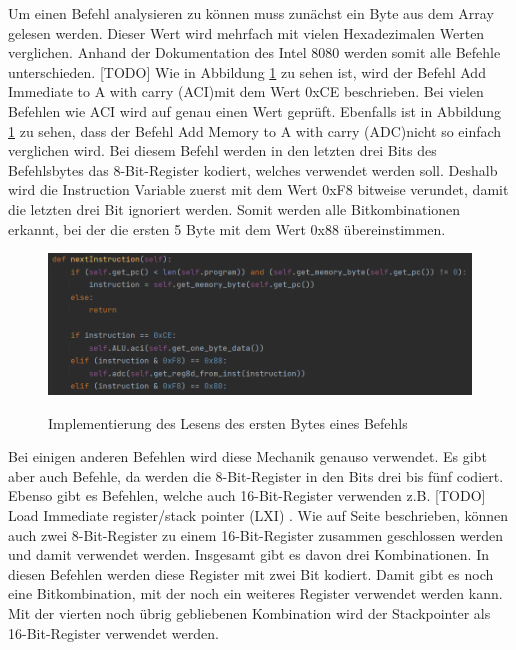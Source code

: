 \documentclass[12pt]{article}
\newcommand{\imgSpaceBefore}{\\[0.2cm]}
\begin{document}
Um einen Befehl analysieren zu können muss zunächst ein Byte aus dem Array gelesen werden. Dieser Wert wird mehrfach mit vielen Hexadezimalen Werten verglichen. Anhand der Dokumentation des Intel 8080 werden somit alle Befehle unterschieden. 
[TODO] Wie in  Abbildung \ref{fig:ReadInstruction} zu sehen ist, wird der Befehl \glqq Add Immediate to A with carry (ACI)\grqq mit dem Wert 0xCE beschrieben.  
Bei vielen Befehlen wie ACI wird auf genau einen Wert geprüft. Ebenfalls ist in Abbildung \ref{fig:ReadInstruction} zu sehen, dass der Befehl \glqq Add Memory to A with carry (ADC)\grqq nicht so einfach verglichen wird. Bei diesem Befehl werden in den letzten drei Bits des Befehlsbytes das 8-Bit-Register kodiert, welches verwendet werden soll. Deshalb wird die Instruction Variable zuerst mit dem Wert 0xF8 bitweise verundet, damit die letzten drei Bit ignoriert werden. Somit werden alle Bitkombinationen erkannt, bei der die ersten 5 Byte mit dem Wert 0x88 übereinstimmen. 
\imgSpaceBefore

\begin{figure}[h]
\caption{Implementierung des Lesens des ersten Bytes eines Befehls}
\centering
\includegraphics[width=15cm]{Bilder/ReadInstruction}
\label{fig:ReadInstruction}
\end{figure}

Bei einigen anderen Befehlen wird diese Mechanik genauso verwendet. Es gibt aber auch Befehle, da werden die 8-Bit-Register in den Bits drei bis fünf codiert. Ebenso gibt es Befehlen, welche auch 16-Bit-Register verwenden z.B.
[TODO] \glqq Load Immediate register/stack pointer (LXI)\grqq 
. Wie auf Seite \pageref{RegisterSection} beschrieben, können auch zwei 8-Bit-Register zu einem 16-Bit-Register zusammen geschlossen werden und damit verwendet werden. Insgesamt gibt es davon drei Kombinationen. In diesen Befehlen werden diese Register mit zwei Bit kodiert. Damit gibt es noch eine Bitkombination, mit der noch ein weiteres Register verwendet werden kann. Mit der vierten noch übrig gebliebenen Kombination wird der Stackpointer als 16-Bit-Register verwendet werden. 
\end{document}
